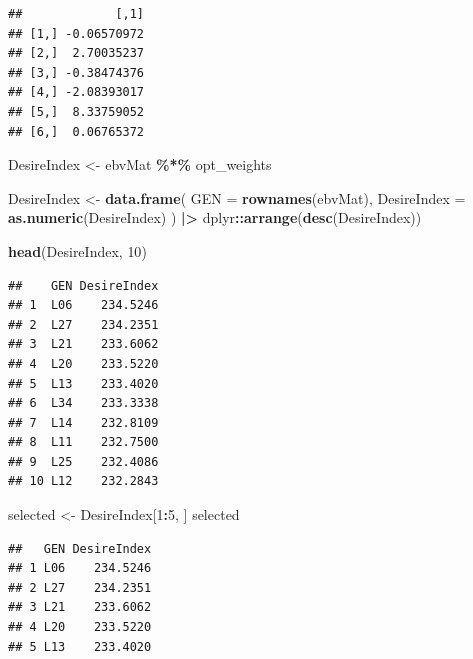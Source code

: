 \documentclass[
  12pt,
]{article}
\newenvironment{Shaded}{\begin{snugshade}}{\end{snugshade}}
\newcommand{\AttributeTok}[1]{\textcolor[rgb]{0.13,0.29,0.53}{#1}}
\newcommand{\DecValTok}[1]{\textcolor[rgb]{0.00,0.00,0.81}{#1}}
\newcommand{\FunctionTok}[1]{\textcolor[rgb]{0.13,0.29,0.53}{\textbf{#1}}}
\newcommand{\NormalTok}[1]{#1}
\newcommand{\OtherTok}[1]{\textcolor[rgb]{0.56,0.35,0.01}{#1}}
\newcommand{\SpecialCharTok}[1]{\textcolor[rgb]{0.81,0.36,0.00}{\textbf{#1}}}
\begin{document}
\begin{verbatim}
##             [,1]
## [1,] -0.06570972
## [2,]  2.70035237
## [3,] -0.38474376
## [4,] -2.08393017
## [5,]  8.33759052
## [6,]  0.06765372
\end{verbatim}

\begin{Shaded}
\begin{Highlighting}[]
\NormalTok{DesireIndex }\OtherTok{\textless{}{-}}\NormalTok{ ebvMat }\SpecialCharTok{\%*\%}\NormalTok{ opt\_weights}

\NormalTok{DesireIndex }\OtherTok{\textless{}{-}} \FunctionTok{data.frame}\NormalTok{(}
  \AttributeTok{GEN =} \FunctionTok{rownames}\NormalTok{(ebvMat),}
  \AttributeTok{DesireIndex =} \FunctionTok{as.numeric}\NormalTok{(DesireIndex)}
\NormalTok{) }\SpecialCharTok{|\textgreater{}}
\NormalTok{  dplyr}\SpecialCharTok{::}\FunctionTok{arrange}\NormalTok{(}\FunctionTok{desc}\NormalTok{(DesireIndex))}

\FunctionTok{head}\NormalTok{(DesireIndex, }\DecValTok{10}\NormalTok{)}
\end{Highlighting}
\end{Shaded}

\begin{verbatim}
##    GEN DesireIndex
## 1  L06    234.5246
## 2  L27    234.2351
## 3  L21    233.6062
## 4  L20    233.5220
## 5  L13    233.4020
## 6  L34    233.3338
## 7  L14    232.8109
## 8  L11    232.7500
## 9  L25    232.4086
## 10 L12    232.2843
\end{verbatim}

\begin{Shaded}
\begin{Highlighting}[]
\NormalTok{selected }\OtherTok{\textless{}{-}}\NormalTok{ DesireIndex[}\DecValTok{1}\SpecialCharTok{:}\DecValTok{5}\NormalTok{, ]}
\NormalTok{selected}
\end{Highlighting}
\end{Shaded}

\begin{verbatim}
##   GEN DesireIndex
## 1 L06    234.5246
## 2 L27    234.2351
## 3 L21    233.6062
## 4 L20    233.5220
## 5 L13    233.4020
\end{verbatim}
\end{document}
